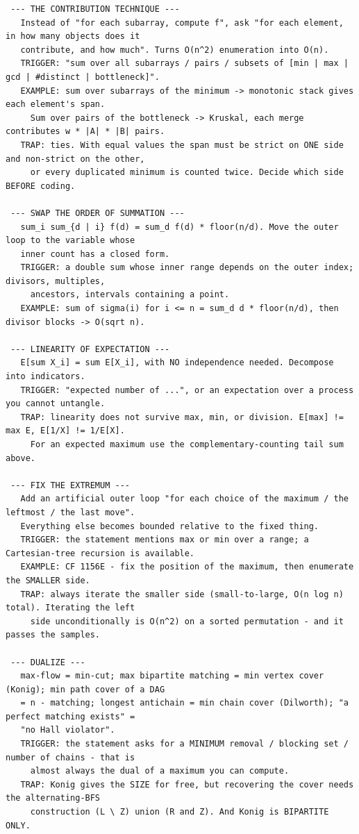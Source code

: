 \documentclass[9pt,a4paper,twocolumn]{extarticle}
\begin{document}
\begin{lstlisting}
 --- THE CONTRIBUTION TECHNIQUE ---
   Instead of "for each subarray, compute f", ask "for each element, in how many objects does it
   contribute, and how much". Turns O(n^2) enumeration into O(n).
   TRIGGER: "sum over all subarrays / pairs / subsets of [min | max | gcd | #distinct | bottleneck]".
   EXAMPLE: sum over subarrays of the minimum -> monotonic stack gives each element's span.
     Sum over pairs of the bottleneck -> Kruskal, each merge contributes w * |A| * |B| pairs.
   TRAP: ties. With equal values the span must be strict on ONE side and non-strict on the other,
     or every duplicated minimum is counted twice. Decide which side BEFORE coding.

 --- SWAP THE ORDER OF SUMMATION ---
   sum_i sum_{d | i} f(d) = sum_d f(d) * floor(n/d). Move the outer loop to the variable whose
   inner count has a closed form.
   TRIGGER: a double sum whose inner range depends on the outer index; divisors, multiples,
     ancestors, intervals containing a point.
   EXAMPLE: sum of sigma(i) for i <= n = sum_d d * floor(n/d), then divisor blocks -> O(sqrt n).

 --- LINEARITY OF EXPECTATION ---
   E[sum X_i] = sum E[X_i], with NO independence needed. Decompose into indicators.
   TRIGGER: "expected number of ...", or an expectation over a process you cannot untangle.
   TRAP: linearity does not survive max, min, or division. E[max] != max E, E[1/X] != 1/E[X].
     For an expected maximum use the complementary-counting tail sum above.

 --- FIX THE EXTREMUM ---
   Add an artificial outer loop "for each choice of the maximum / the leftmost / the last move".
   Everything else becomes bounded relative to the fixed thing.
   TRIGGER: the statement mentions max or min over a range; a Cartesian-tree recursion is available.
   EXAMPLE: CF 1156E - fix the position of the maximum, then enumerate the SMALLER side.
   TRAP: always iterate the smaller side (small-to-large, O(n log n) total). Iterating the left
     side unconditionally is O(n^2) on a sorted permutation - and it passes the samples.

 --- DUALIZE ---
   max-flow = min-cut; max bipartite matching = min vertex cover (Konig); min path cover of a DAG
   = n - matching; longest antichain = min chain cover (Dilworth); "a perfect matching exists" =
   "no Hall violator".
   TRIGGER: the statement asks for a MINIMUM removal / blocking set / number of chains - that is
     almost always the dual of a maximum you can compute.
   TRAP: Konig gives the SIZE for free, but recovering the cover needs the alternating-BFS
     construction (L \ Z) union (R and Z). And Konig is BIPARTITE ONLY.


\end{lstlisting}
\end{document}

